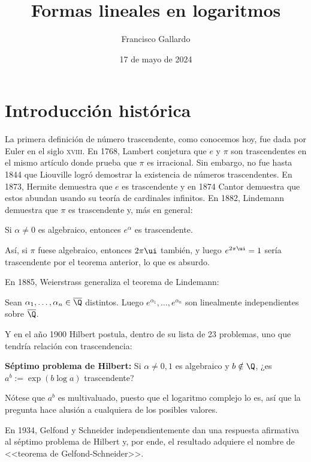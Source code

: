 \documentclass[11pt, reqno]{amsart}
\title{Formas lineales en logaritmos}
\author{Francisco Gallardo}
\date{17 de mayo de 2024}
\begin{document}
\maketitle

\section{Introducción histórica}
La primera definición de número trascendente, como conocemos hoy, fue dada por Euler en el siglo \textsc{xviii}.
En 1768, Lambert conjetura que $e$ y $\pi$ son trascendentes en el mismo artículo donde prueba que $\pi$ es irracional.
Sin embargo, no fue hasta 1844 que Liouville logró demostrar la existencia de números trascendentes.
En 1873, Hermite demuestra que $e$ es trascendente y en 1874 Cantor demuestra que estos abundan usando su teoría de cardinales infinitos.
En 1882, Lindemann demuestra que $\pi$ es trascendente y, más en general:
\begin{thm}[Lindemann, 1882]
	Si $\alpha\neq 0$ es algebraico, entonces $e^{\alpha}$ es trascendente.
\end{thm}
Así, si $\pi$ fuese algebraico, entonces $2\pi\ui$ también, y luego $e^{2\pi\ui}=1$ sería trascendente por el teorema anterior, lo que es absurdo.

En 1885, Weierstrass generaliza el teorema de Lindemann:
\begin{thm}
	\label{LW}
	Sean $\alpha_1,\ldots,\alpha_n\in \overline{\Q}$ distintos.
	Luego $e^{\alpha_1},\ldots,e^{\alpha_n}$ son linealmente independientes sobre $\overline{\Q}$.
\end{thm}

Y en el año 1900 Hilbert postula, dentro de su lista de 23 problemas, uno que tendría relación con trascendencia:
\begin{displayquote}
	\textbf{Séptimo problema de Hilbert:}
	Si $\alpha\neq 0,1$ es algebraico y $b\notin\Q$, ¿es $a^b := \exp(b\log a)$ trascendente?
\end{displayquote}
Nótese que $a^b$ es multivaluado, puesto que el logaritmo complejo lo es, así que la pregunta hace alusión a cualquiera de los posibles valores.

En 1934, Gelfond y Schneider independientemente dan una respuesta afirmativa al
séptimo problema de Hilbert y, por ende, el resultado adquiere el nombre de
<<teorema de Gelfond-Schneider>>.
\end{document}
